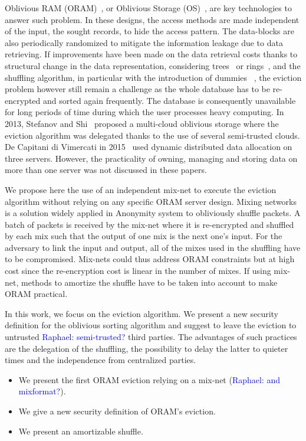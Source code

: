 \documentclass{llncs}
\newcommand{\raphael}[1]{\textcolor{blue}{Raphael: #1}}
\begin{document}
Oblivious RAM (ORAM)~\cite{goldreich87}, or Oblivious Storage (OS)~\cite{boneh2011}, are key technologies to answer such problem. In these designs, the access methods are made independent of the input, the sought records, to hide the access pattern. The data-blocks are also periodically randomized to mitigate the information leakage due to data retrieving.
If improvements have been made on the data retrieval costs thanks to structural change in the data representation, considering trees~\cite{stefanov2013path} or rings~\cite{ren2014ring}, and the shuffling algorithm, in particular with the introduction of dummies ~\cite{ohrimenko2014melbourne}, the eviction problem however still remain a challenge as the whole database has to be re-encrypted and sorted again frequently. The database is consequently unavailable for long periods of time during which the user processes heavy computing.
In 2013, Stefanov and Shi~\cite{stefanov2013} proposed a multi-cloud oblivious storage where the eviction algorithm was delegated thanks to the use of several semi-trusted clouds. De Capitani di Vimercati in 2015~\cite{dithree} used dynamic distributed data allocation on three servers.
However, the practicality of owning, managing and storing data on more than one server was not discussed in these papers.

We propose here the use of an independent mix-net to execute the eviction algorithm without relying on any specific ORAM server design.
Mixing networks is a solution widely applied in Anonymity system to obliviously shuffle packets. A batch of packets is received by the mix-net where it is re-encrypted and shuffled by each mix such that the output of one mix is the next one’s input.
For the adversary to link the input and output, all of the mixes used in the shuffling have to be compromised.
Mix-nets could thus address ORAM constraints but at high cost since the re-encryption cost is linear in the number of mixes. If using mix-net, methods to amortize the shuffle have to be taken into account to make ORAM practical.

In this work, we focus on the eviction algorithm. We present a new security definition for the oblivious sorting algorithm and suggest to leave the eviction to untrusted \raphael{semi-trusted?} third parties.
The advantages of such practices are the delegation of the shuffling, the possibility to delay the latter to quieter times and the independence from centralized parties.

\begin{itemize}
 \item We present the first ORAM eviction relying on a mix-net (\raphael{and mixformat?}).
 \item We give a new security definition of ORAM's eviction. %
 \item We present an amortizable shuffle.
\end{itemize}
\end{document}
